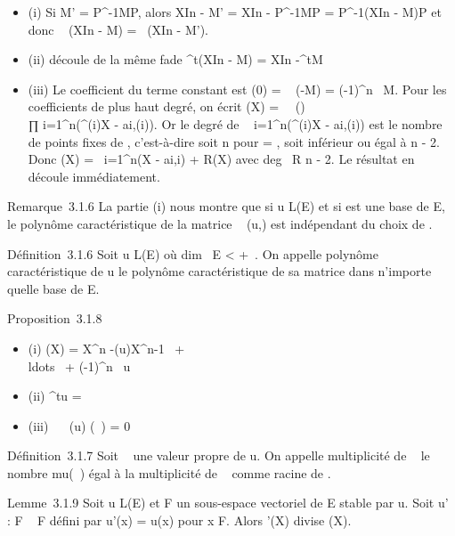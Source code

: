 \begin{itemize}
\itemsep1pt\parskip0pt
\item
  (i) Si M' = P^-1MP, alors XIn - M' =
  XIn - P^-1MP = P^-1(XIn -
  M)P et donc ~
  (XIn - M) =\
   (XIn - M').
\item
  (ii) découle de la même fa\ccon de
  ^t(XIn - M) = XIn -^tM
\item
  (iii) Le coefficient du terme constant est \chiM(0)
  = ~ (-M) =
  (-1)^n\
  \mathrm{det} M. Pour les coefficients de plus haut
  degré, on écrit \chiM(X) =\
  \sum ~
  \sigma\inSn\epsilon(\sigma)\\∏
   i=1^n(\deltai^\sigma(i)X -
  ai,\sigma(i)). Or le degré de
  \∏ ~
  i=1^n(\deltai^\sigma(i)X - ai,\sigma(i))
  est le nombre de points fixes de \sigma, c'est-à-dire soit n pour \sigma =
  \mathrmId, soit inférieur ou égal à n - 2. Donc
  \chiM(X) =\ \∏
   i=1^n(X - ai,i) + R(X) avec
  deg~ R \leq n - 2. Le résultat en découle
  immédiatement.
\end{itemize}

Remarque~3.1.6 La partie (i) nous montre que si u \in L(E) et si  est une
base de E, le polynôme caractéristique de la matrice
\mathrmMat~ (u,) est
indépendant du choix de \mathcal{E}.

Définition~3.1.6 Soit u \in L(E) où dim~ E
\textless{} +\infty~. On appelle polynôme caractéristique de u le polynôme
caractéristique de sa matrice dans n'importe quelle base de E.

Proposition~3.1.8

\begin{itemize}
\itemsep1pt\parskip0pt
\item
  (i) \chiu(X) = X^n
  -(u)X^n-1~
  + \\ldots~ +
  (-1)^n\
   u
\item
  (ii) \chi^tu = \chiu
\item
  (iii) \lambda~ \in{}~(u)
  \Leftrightarrow \chiu(\lambda~) = 0
\end{itemize}

Définition~3.1.7 Soit \lambda~ une valeur propre de u. On appelle multiplicité
de \lambda~ le nombre mu(\lambda~) égal à la multiplicité de \lambda~ comme racine
de \chiu.

Lemme~3.1.9 Soit u \in L(E) et F un sous-espace vectoriel de E stable par
u. Soit u' : F \rightarrow~ F défini par u'(x) = u(x) pour x \in F. Alors
\chiu'(X) divise \chiu(X).

